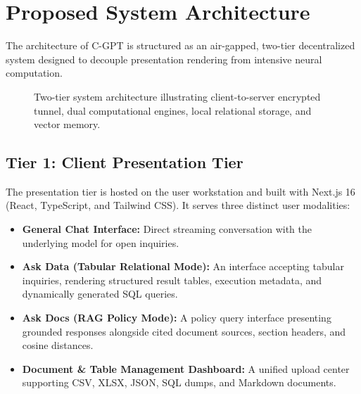 \documentclass[conference]{IEEEtran}
\begin{document}
\section{Proposed System Architecture}
The architecture of C-GPT is structured as an air-gapped, two-tier decentralized system designed to decouple presentation rendering from intensive neural computation.

\begin{figure}[htbp]
\centering

\caption{Two-tier system architecture illustrating client-to-server encrypted tunnel, dual computational engines, local relational storage, and vector memory.}
\label{fig:architecture}
\end{figure}

\subsection{Tier 1: Client Presentation Tier}
The presentation tier is hosted on the user workstation and built with Next.js 16 (React, TypeScript, and Tailwind CSS). It serves three distinct user modalities:
\begin{itemize}
    \item \textbf{General Chat Interface:} Direct streaming conversation with the underlying model for open inquiries.
    \item \textbf{Ask Data (Tabular Relational Mode):} An interface accepting tabular inquiries, rendering structured result tables, execution metadata, and dynamically generated SQL queries.
    \item \textbf{Ask Docs (RAG Policy Mode):} A policy query interface presenting grounded responses alongside cited document sources, section headers, and cosine distances.
    \item \textbf{Document \& Table Management Dashboard:} A unified upload center supporting CSV, XLSX, JSON, SQL dumps, and Markdown documents.
\end{itemize}
\end{document}
